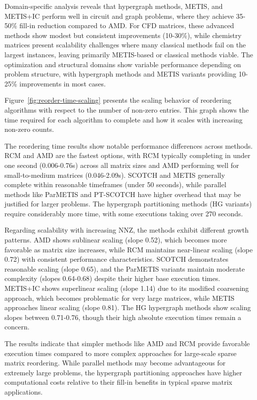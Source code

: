 Domain-specific analysis reveals that hypergraph methods, METIS, and METIS+IC perform well in circuit and graph problems, where they achieve 35-50\% fill-in reduction compared to AMD. For CFD matrices, these advanced methods show modest but consistent improvements (10-30\%), while chemistry matrices present scalability challenges where many classical methods fail on the largest instances, leaving primarily METIS-based or classical methods viable. The optimization and structural domains show variable performance depending on problem structure, with hypergraph methods and METIS variants providing 10-25\% improvements in most cases.

Figure~\ref{fig:reorder-time-scaling} presents the scaling behavior of reordering algorithms with respect to the number of non-zero entries. This graph shows the time required for each algorithm to complete and how it scales with increasing non-zero counts. 

The reordering time results show notable performance differences across methods. RCM and AMD are the fastest options, with RCM typically completing in under one second (0.006-0.76s) across all matrix sizes and AMD performing well for small-to-medium matrices (0.046-2.09s). SCOTCH and METIS generally complete within reasonable timeframes (under 50 seconds), while parallel methods like ParMETIS and PT-SCOTCH have higher overhead that may be justified for larger problems. The hypergraph partitioning methods (HG variants) require considerably more time, with some executions taking over 270 seconds.

Regarding scalability with increasing NNZ, the methods exhibit different growth patterns. AMD shows sublinear scaling (slope 0.52), which becomes more favorable as matrix size increases, while RCM maintains near-linear scaling (slope 0.72) with consistent performance characteristics. SCOTCH demonstrates reasonable scaling (slope 0.65), and the ParMETIS variants maintain moderate complexity (slopes 0.64-0.68) despite their higher base execution times. METIS+IC shows superlinear scaling (slope 1.14) due to its modified coarsening approach, which becomes problematic for very large matrices, while METIS approaches linear scaling (slope 0.81). The HG hypergraph methods show scaling slopes between 0.71-0.76, though their high absolute execution times remain a concern.

The results indicate that simpler methods like AMD and RCM provide favorable execution times compared to more complex approaches for large-scale sparse matrix reordering. While parallel methods may become advantageous for extremely large problems, the hypergraph partitioning approaches have higher computational costs relative to their fill-in benefits in typical sparse matrix applications.


